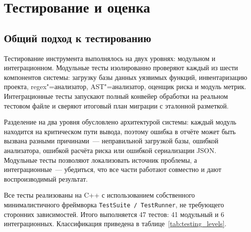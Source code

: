 
\section{Тестирование и оценка}

\subsection{Общий подход к тестированию}

Тестирование инструмента выполнялось на двух уровнях: модульном
и интеграционном.
Модульные тесты изолированно проверяют каждый из шести компонентов
системы: загрузку базы данных уязвимых функций, инвентаризацию проекта,
regex"=анализатор, AST"=анализатор, оценщик риска и модуль метрик.
Интеграционные тесты запускают полный конвейер обработки на реальном
тестовом файле и сверяют итоговый план миграции с эталонной разметкой.

Разделение на два уровня обусловлено архитектурой системы: каждый
модуль находится на критическом пути вывода, поэтому ошибка в
отчёте может быть вызвана разными причинами~--- неправильной загрузкой
базы, ошибкой анализатора, ошибкой расчёта риска или ошибкой сериализации
JSON.
Модульные тесты позволяют локализовать источник проблемы, а
интеграционные~--- убедиться, что все части работают совместно и
дают воспроизводимый результат.

Все тесты реализованы на C++ с использованием собственного минималистичного
фреймворка \texttt{TestSuite / TestRunner}, не требующего сторонних
зависимостей.
Итого выполняется 47 тестов: 41 модульный и 6 интеграционных.
Классификация приведена в таблице~\ref{tab:testing_levels}.

